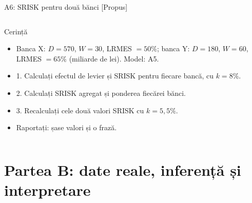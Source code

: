 \begin{frame}{A6: SRISK pentru două bănci [Propus]}
\propsub
\itemsize{\scriptsize}
\begin{columns}[T]
\begin{column}{\taskw}
\begin{block}{Cerință}
\begin{itemize}
    \item Banca X: $D = 570$, $W = 30$, LRMES $= 50\%$; banca Y: $D = 180$, $W = 60$, LRMES $= 65\%$ (miliarde de lei). Model: A5.
    \item 1. Calculați efectul de levier și SRISK pentru fiecare bancă, cu $k = 8\%$.
    \item 2. Calculați SRISK agregat și ponderea fiecărei bănci.
    \item 3. Recalculați cele două valori SRISK cu $k = 5{,}5\%$.
    \item Raportați: șase valori și o frază.
\end{itemize}
\end{block}
\end{column}
\begin{column}{\solw}
\end{column}
\end{columns}
\end{frame}


\section{Partea B: date reale, inferență și interpretare}

